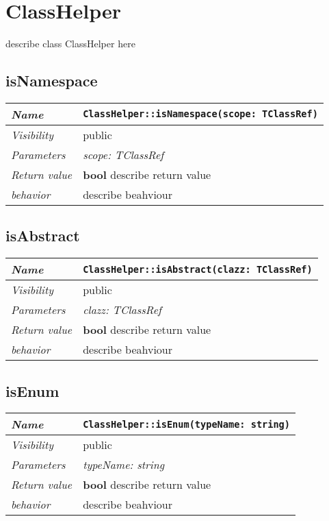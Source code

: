 \chapter{ClassHelper}
describe class ClassHelper here
\section{isNamespace}
\begin{longtable}{p{3cm} @{\hskip 1cm} p{12cm}}
 \hline
\textit{Name} & \texttt{ClassHelper::isNamespace(scope: TClassRef)}\\
\hline
 \textit{Visibility} & public\\
\hline
\textit{Parameters} & \textit{scope: TClassRef}\\
\hline
\textit{Return value} & \textbf{ bool} describe return value\\
  \hline
 \textit{behavior} & describe beahviour \\
\hline
\end{longtable} \pagebreak
 \section{isAbstract}
\begin{longtable}{p{3cm} @{\hskip 1cm} p{12cm}}
 \hline
\textit{Name} & \texttt{ClassHelper::isAbstract(clazz: TClassRef)}\\
\hline
 \textit{Visibility} & public\\
\hline
\textit{Parameters} & \textit{clazz: TClassRef}\\
\hline
\textit{Return value} & \textbf{ bool} describe return value\\
  \hline
 \textit{behavior} & describe beahviour \\
\hline
\end{longtable} \pagebreak
 \section{isEnum}
\begin{longtable}{p{3cm} @{\hskip 1cm} p{12cm}}
 \hline
\textit{Name} & \texttt{ClassHelper::isEnum(typeName: string)}\\
\hline
 \textit{Visibility} & public\\
\hline
\textit{Parameters} & \textit{typeName: string}\\
\hline
\textit{Return value} & \textbf{ bool} describe return value\\
  \hline
 \textit{behavior} & describe beahviour \\
\hline
\end{longtable} \pagebreak
